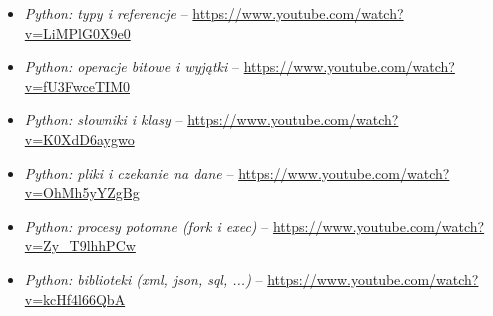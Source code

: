 % 
% 
% 
% 

\begin{itemize}
\item \emph{Python: typy i referencje} – \url{https://www.youtube.com/watch?v=LiMPlG0X9e0}
\item \emph{Python: operacje bitowe i wyjątki} – \url{https://www.youtube.com/watch?v=fU3FwceTIM0}
\item \emph{Python: słowniki i klasy} – \url{https://www.youtube.com/watch?v=K0XdD6aygwo}
\item \emph{Python: pliki i czekanie na dane} – \url{https://www.youtube.com/watch?v=OhMh5yYZgBg}
\item \emph{Python: procesy potomne (fork i exec)} – \url{https://www.youtube.com/watch?v=Zy_T9lhhPCw}
\item \emph{Python: biblioteki (xml, json, sql, ...)} – \url{https://www.youtube.com/watch?v=kcHf4l66QbA}
\end{itemize}
